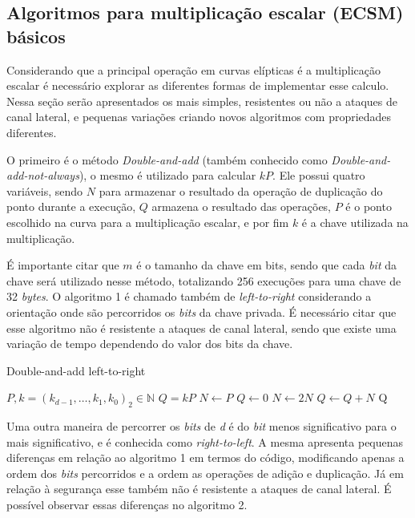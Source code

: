 \subsection{Algoritmos para multiplicação escalar (ECSM) básicos}
Considerando que a principal operação em curvas elípticas é a multiplicação escalar é necessário explorar as diferentes formas de implementar esse calculo. Nessa seção serão apresentados os mais simples, resistentes ou não a ataques de canal lateral, e pequenas variações criando novos algoritmos com propriedades diferentes.

O primeiro é o método \textit{Double-and-add} (também conhecido como \textit{Double-and-add-not-always}), o mesmo é utilizado para calcular $kP$. Ele possui quatro variáveis, sendo $N$ para armazenar o resultado da operação de duplicação do ponto durante a execução, $Q$ armazena o resultado das operações, $P$ é o ponto escolhido na curva para a multiplicação escalar, e por fim $k$ é a chave utilizada na multiplicação.

É importante citar que $m$ é o tamanho da chave em bits, sendo que cada \textit{bit} da chave será utilizado nesse método, totalizando 256 execuções para uma chave de 32 \textit{bytes}. O algoritmo 1 é chamado também de \textit{left-to-right} considerando a orientação onde são percorridos os \textit{bits} da chave privada. É necessário citar que esse algoritmo não é resistente a ataques de canal lateral, sendo que existe uma variação de tempo dependendo do valor dos bits da chave.

\begin{algorithm}[H]
\caption{Double-and-add left-to-right}
\begin{algorithmic} 
    \REQUIRE $P, k=(k_{d-1},\ldots,k_1,k_0)_2 \in \mathbb{N}$
    \ENSURE $Q = kP$
    \STATE $N \leftarrow P$
    \STATE $Q \leftarrow 0$
        \STATE $N \leftarrow 2N$
            \STATE $Q \leftarrow Q+N$
        \ENDIF
    \ENDFOR
    \RETURN Q
    \end{algorithmic}
\end{algorithm}

Uma outra maneira de percorrer os \textit{bits} de \textit{d} é do \textit{bit} menos significativo para o  mais significativo, e é conhecida como \textit{right-to-left}. A mesma apresenta pequenas diferenças em relação ao algoritmo 1 em termos do código, modificando apenas a ordem dos \textit{bits} percorridos e a ordem as operações de adição e duplicação. Já em relação à segurança esse também não é resistente a ataques de canal lateral. É possível observar essas diferenças no algoritmo 2.

